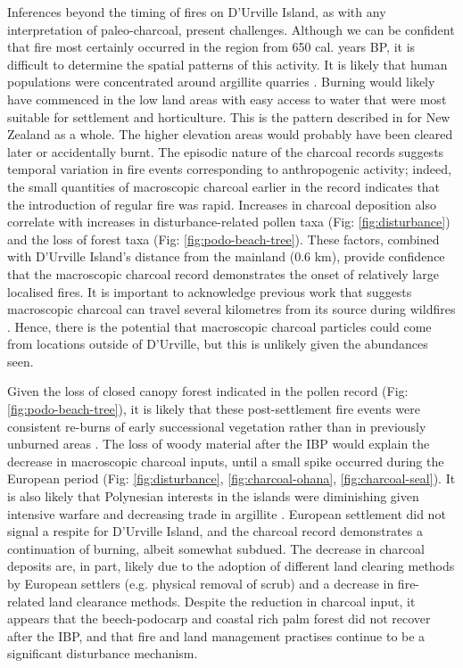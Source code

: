 \documentclass{article}
\begin{document}
Inferences beyond the timing of fires on D'Urville Island, as with any interpretation of paleo-charcoal, present challenges.  Although we can be confident that fire most certainly occurred in the region from 650 cal. years BP, it is difficult to determine the spatial patterns of this activity.  It is likely that human populations were concentrated around argillite quarries \citep{walter2010colonisation}.  Burning would likely have commenced in the low land areas with easy access to water that were most suitable for settlement and horticulture.  This is the pattern described in \cite{Perry2012} for New Zealand as a whole.  The higher elevation areas would probably have been cleared later or accidentally burnt.  The episodic nature of the charcoal records suggests temporal variation in fire events corresponding to anthropogenic activity; indeed, the small quantities of macroscopic charcoal earlier in the record indicates that the introduction of regular fire was rapid.  Increases in charcoal deposition also correlate with increases in disturbance-related pollen taxa (Fig: \ref{fig:disturbance}) and the loss of forest taxa (Fig: \ref{fig:podo-beach-tree}).  These factors, combined with D'Urville Island's distance from the mainland (0.6 km), provide confidence  that the macroscopic charcoal record demonstrates the onset of relatively large localised fires.  It is important to acknowledge previous work that suggests macroscopic charcoal can travel several kilometres from its source during wildfires \citep{tinner1998,Tinner2006}.  Hence, there is the potential that macroscopic charcoal particles could come from locations outside of D'Urville, but this is unlikely given the abundances seen.  

Given the loss of closed canopy forest indicated in the pollen record (Fig: \ref{fig:podo-beach-tree}), it is likely that these post-settlement fire events were consistent re-burns of early successional vegetation rather than in previously unburned areas \citep{Perry2014}.  The loss of woody material after the IBP would explain the decrease in macroscopic charcoal inputs, until a small spike occurred during the European period (Fig: \ref{fig:disturbance}, \ref{fig:charcoal-ohana}, \ref{fig:charcoal-seal}).  It is also likely that Polynesian interests in the islands were diminishing given intensive warfare and decreasing trade in argillite \citep{Wellman1962}.  European settlement did not signal a respite for D'Urville Island, and the charcoal record demonstrates a continuation of burning, albeit somewhat subdued.  The decrease in charcoal deposits are, in part, likely due to the adoption of different land clearing methods by European settlers (e.g. physical removal of scrub) and a decrease in fire-related land clearance methods. Despite the reduction in charcoal input, it appears that the beech-podocarp and coastal rich palm forest did not recover after the IBP, and that fire and land management practises continue to be a significant disturbance mechanism.
\end{document}

